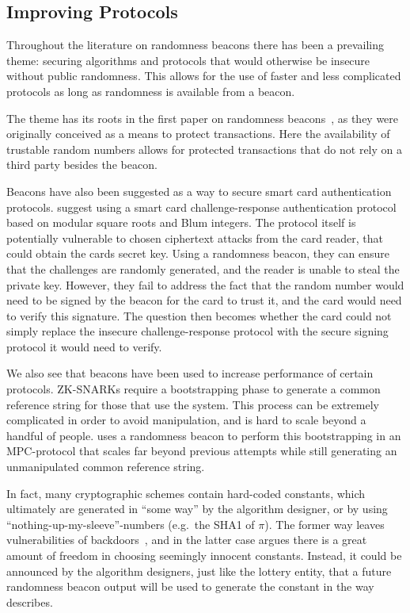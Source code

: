 \subsection{Improving Protocols}
Throughout the literature on randomness beacons there has been a prevailing theme: securing algorithms and protocols that would otherwise be insecure without public randomness. This allows for the use of faster and less complicated protocols as long as randomness is available from a beacon.

The theme has its roots in the first paper on randomness beacons~\cite{rabin1983transaction}, as they were originally conceived as a means to protect transactions. Here the availability of trustable random numbers allows for protected transactions that do not rely on a third party besides the beacon.

Beacons have also been suggested as a way to secure smart card authentication protocols. \citet{fischer2011publicrandomnessservice} suggest using a smart card challenge-response authentication protocol based on modular square roots and Blum integers. The protocol itself is potentially vulnerable to chosen ciphertext attacks from the card reader, that could obtain the cards secret key. Using a randomness beacon, they can ensure that the challenges are randomly generated, and the reader is unable to steal the private key. However, they fail to address the fact that the random number would need to be signed by the beacon for the card to trust it, and the card would need to verify this signature. The question then becomes whether the card could not simply replace the insecure challenge-response protocol with the secure signing protocol it would need to verify.

We also see that beacons have been used to increase performance of certain protocols. ZK-SNARKs require a bootstrapping phase to generate a common reference string for those that use the system. This process can be extremely complicated in order to avoid manipulation, and is hard to scale beyond a handful of people.  uses a randomness beacon to perform this bootstrapping in an MPC-protocol that scales far beyond previous attempts while still generating an unmanipulated common reference string.

In fact, many cryptographic schemes contain hard-coded constants, which ultimately are generated in \enquote{some way} by the algorithm designer, or by using \enquote{nothing-up-my-sleeve}-numbers (e.g.\ the SHA1 of $\pi$).
The former way leaves vulnerabilities of backdoors~, and in the latter case  argues there is a great amount of freedom in choosing seemingly innocent constants.
Instead, it could be announced by the algorithm designers, just like the lottery entity, that a future randomness beacon output will be used to generate the constant in the way  describes.
